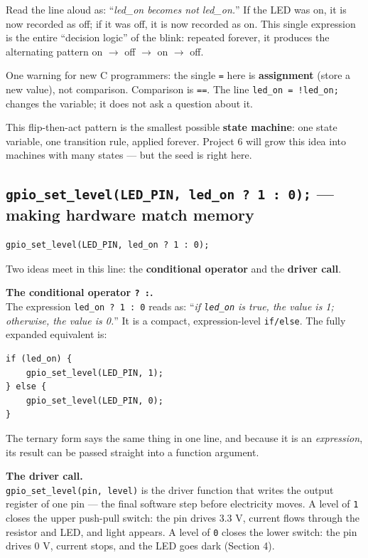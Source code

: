 \documentclass[11pt]{article}
\begin{document}
Read the line aloud as: ``\emph{led\_on becomes not led\_on.}'' If the LED was on, it is now recorded as off; if it was off, it is now recorded as on. This single expression is the entire ``decision logic'' of the blink: repeated forever, it produces the alternating pattern on $\rightarrow$ off $\rightarrow$ on $\rightarrow$ off.

One warning for new C programmers: the single \texttt{=} here is \textbf{assignment} (store a new value), not comparison. Comparison is \texttt{==}. The line \texttt{led\_on = !led\_on;} changes the variable; it does not ask a question about it.

This flip-then-act pattern is the smallest possible \textbf{state machine}: one state variable, one transition rule, applied forever. Project 6 will grow this idea into machines with many states --- but the seed is right here.

\subsection{\texttt{gpio\_set\_level(LED\_PIN, led\_on ? 1 : 0);} --- making hardware match memory}

\begin{verbatim}
gpio_set_level(LED_PIN, led_on ? 1 : 0);
\end{verbatim}

Two ideas meet in this line: the \textbf{conditional operator} and the \textbf{driver call}.

\textbf{The conditional operator \texttt{? :}.} \\
The expression \texttt{led\_on ? 1 : 0} reads as: ``\emph{if \texttt{led\_on} is true, the value is 1; otherwise, the value is 0.}'' It is a compact, expression-level \texttt{if/else}. The fully expanded equivalent is:

\begin{verbatim}
if (led_on) {
    gpio_set_level(LED_PIN, 1);
} else {
    gpio_set_level(LED_PIN, 0);
}
\end{verbatim}

The ternary form says the same thing in one line, and because it is an \emph{expression}, its result can be passed straight into a function argument.

\textbf{The driver call.} \\
\texttt{gpio\_set\_level(pin, level)} is the driver function that writes the output register of one pin --- the final software step before electricity moves. A level of \texttt{1} closes the upper push-pull switch: the pin drives 3.3 V, current flows through the resistor and LED, and light appears. A level of \texttt{0} closes the lower switch: the pin drives 0 V, current stops, and the LED goes dark (Section 4).
\end{document}
